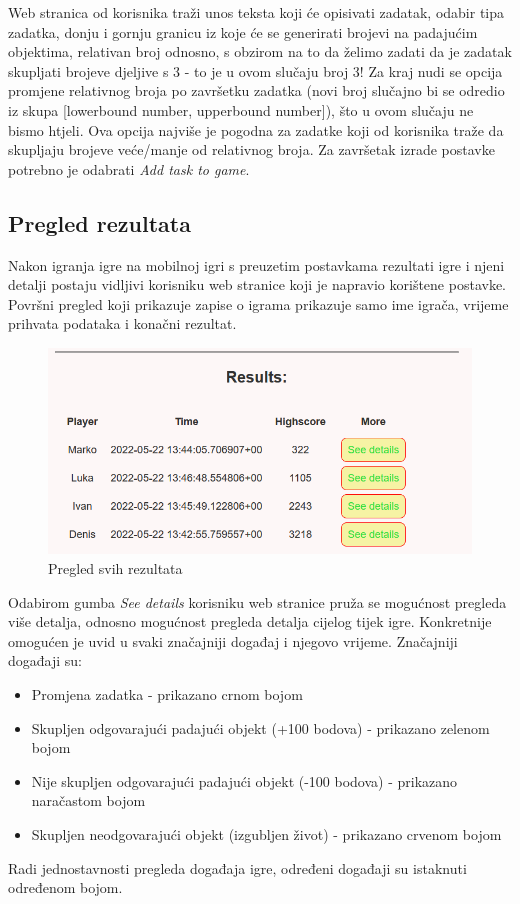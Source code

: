 \documentclass[times, utf8, zavrsni, numeric]{fer}
\begin{document}
		Web stranica od korisnika traži unos teksta koji će opisivati zadatak, odabir tipa zadatka, donju i gornju granicu iz koje će se generirati brojevi na padajućim objektima, relativan broj odnosno, s obzirom na to da želimo zadati da je zadatak
		skupljati brojeve djeljive s 3 - to je u ovom slučaju broj 3! Za kraj nudi se opcija promjene relativnog broja po završetku zadatka (novi broj slučajno bi se odredio iz skupa [lowerbound number, upperbound number]), što u ovom slučaju ne bismo
		htjeli. Ova opcija najviše je pogodna za zadatke koji od korisnika traže da skupljaju brojeve veće/manje od relativnog broja. Za završetak izrade postavke potrebno je odabrati \textit{Add task to game}.
	
	\subsection{Pregled rezultata}
	Nakon igranja igre na mobilnoj igri s preuzetim postavkama rezultati igre i njeni detalji postaju vidljivi korisniku web stranice koji je napravio korištene postavke. 
	Površni pregled koji prikazuje zapise o igrama prikazuje samo ime igrača, vrijeme prihvata podataka i konačni rezultat.
	\begin{figure}[H]
		\includegraphics[scale = 0.9]{"slike/pregledsvihrezultata.png"} 
		\centering
		\caption{Pregled svih rezultata}
		\label{fig:pregledsvihrezultata}
	\end{figure}
	
	Odabirom gumba \textit{See details} korisniku web stranice pruža se mogućnost pregleda više detalja, odnosno mogućnost pregleda detalja cijelog tijek igre. Konkretnije omogućen je uvid u svaki značajniji događaj i njegovo vrijeme.
	Značajniji događaji su:
		\begin{itemize}
				\item  {Promjena zadatka - prikazano crnom bojom}
				\item  {Skupljen odgovarajući padajući objekt (+100 bodova) - prikazano zelenom bojom}
				\item  {Nije skupljen odgovarajući padajući objekt (-100 bodova) - prikazano naračastom bojom}
				\item  {Skupljen neodgovarajući objekt (izgubljen život) - prikazano crvenom bojom}
		\end{itemize}
	Radi jednostavnosti pregleda događaja igre, određeni događaji su istaknuti određenom bojom.
	
\end{document}
